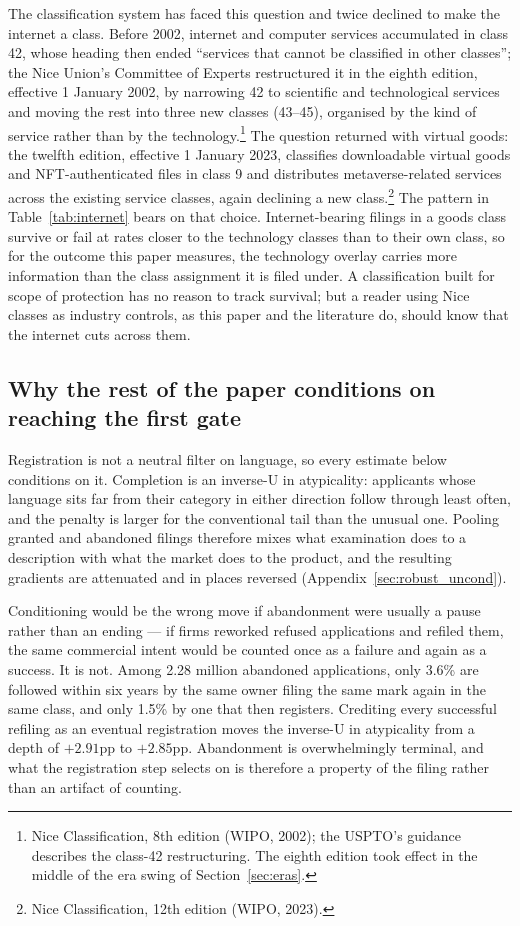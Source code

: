The classification system has faced this question and twice declined to
make the internet a class. Before 2002, internet and computer services
accumulated in class 42, whose heading then ended ``services that cannot be
classified in other classes''; the Nice Union's Committee of Experts
restructured it in the eighth edition, effective 1 January 2002, by
narrowing 42 to scientific and technological services and moving the rest
into three new classes (43--45), organised by the kind of service rather
than by the technology.\footnote{Nice Classification, 8th edition (WIPO,
2002); the USPTO's guidance describes the class-42 restructuring. The
eighth edition took effect in the middle of the era swing of
Section~\ref{sec:eras}.} The question returned with virtual goods: the
twelfth edition, effective 1 January 2023, classifies downloadable virtual
goods and NFT-authenticated files in class 9 and distributes
metaverse-related services across the existing service classes, again
declining a new class.\footnote{Nice Classification, 12th edition (WIPO,
2023).} The pattern in Table~\ref{tab:internet} bears on that choice.
Internet-bearing filings in a goods class survive or fail at rates closer
to the technology classes than to their own class, so for the outcome this
paper measures, the technology overlay carries more information than the
class assignment it is filed under. A classification built for scope of
protection has no reason to track survival; but a reader using Nice classes
as industry controls, as this paper and the literature do, should know that
the internet cuts across them.

\subsection{Why the rest of the paper conditions on reaching the first gate}\label{sec:filter}

Registration is not a neutral filter on language, so every estimate below
conditions on it. Completion is an inverse-U in atypicality: applicants whose
language sits far from their category in either direction follow through least
often, and the penalty is larger for the conventional tail than the unusual
one. Pooling granted and abandoned filings therefore mixes what examination
does to a description with what the market does to the product, and the
resulting gradients are attenuated and in places reversed
(Appendix~\ref{sec:robust_uncond}).

Conditioning would be the wrong move if abandonment were usually a pause
rather than an ending --- if firms reworked refused applications and refiled
them, the same commercial intent would be counted once as a failure and again
as a success. It is not. Among 2.28 million abandoned applications, only
3.6\% are followed within six years by the same owner filing the same mark
again in the same class, and only 1.5\% by one that then registers. Crediting
every successful refiling as an eventual registration moves the inverse-U in
atypicality from a depth of $+2.91$pp to $+2.85$pp. Abandonment is
overwhelmingly terminal, and what the registration step selects on is
therefore a property of the filing rather than an artifact of counting.

